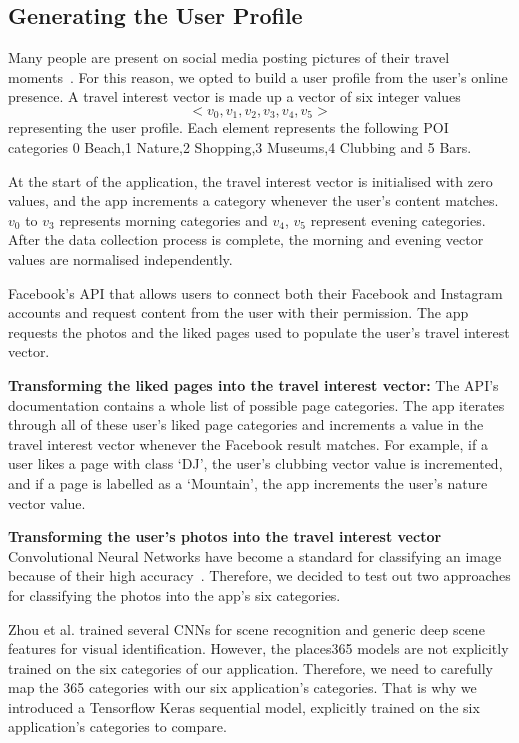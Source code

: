 \subsection{Generating the User Profile}

Many people are present on social media posting
pictures of their travel moments~\cite{Miller2016}. For this reason, we opted to
build a user profile from the user's online presence. A travel interest vector is made up a vector of six integer values
\[<v_0, v_1, v_2, v_3, v_4, v_5>\] representing the user profile.
Each element represents the following POI categories 0 Beach,1 Nature,2
Shopping,3 Museums,4 Clubbing and 5 Bars.
    

At the start of the application, the
travel interest vector is initialised with zero
values, and the app increments a category whenever the
user's content matches. $v_0$ to $v_3$ represents morning categories
and $v_4$, $v_5$ represent evening categories. After
the data collection process is complete, the
morning and evening vector values are normalised independently. 

Facebook's API that allows users to connect both their Facebook
and Instagram accounts and request content from the user with their permission.
The app requests the photos and the liked pages used to 
populate the user's travel interest
vector. 

\noindent \textbf{Transforming the liked pages into the travel interest vector: } The API's documentation contains a whole list of possible
page categories. 
The app iterates through all of these user's liked
page categories and increments a value in the travel
interest vector whenever the Facebook result matches.
For example, if a user likes a page with class `DJ',
the user's clubbing vector value is incremented, and if a page is labelled as a
`Mountain', the app increments the user's nature vector value.

\noindent \textbf{Transforming the user's photos into the travel interest
vector} Convolutional Neural Networks have become a standard
for classifying an image because of their high
accuracy~\cite{Zhou2018}. Therefore, we decided to test
out two approaches for classifying the photos into the
app's six categories. 

Zhou et al. \cite{Zhou2018} trained several CNNs for
scene recognition and generic deep scene features for
visual identification. However, the places365 models
are not explicitly trained on the six categories of
our application. Therefore, we need to carefully map
the 365 categories with our six application's
categories. That is why we introduced a Tensorflow
Keras sequential model, explicitly trained on the six
application's categories to compare.

